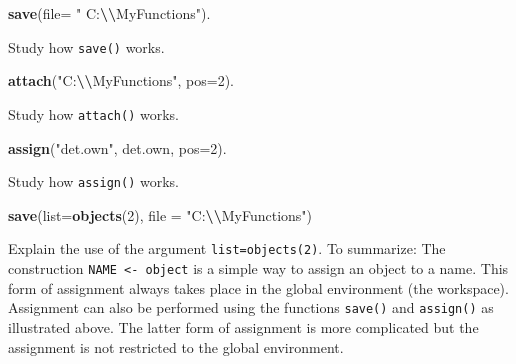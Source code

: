 \documentclass[
]{book}
\newenvironment{Shaded}{\begin{snugshade}}{\end{snugshade}}
\newcommand{\AttributeTok}[1]{\textcolor[rgb]{0.13,0.29,0.53}{#1}}
\newcommand{\DecValTok}[1]{\textcolor[rgb]{0.00,0.00,0.81}{#1}}
\newcommand{\FunctionTok}[1]{\textcolor[rgb]{0.13,0.29,0.53}{\textbf{#1}}}
\newcommand{\NormalTok}[1]{#1}
\newcommand{\SpecialCharTok}[1]{\textcolor[rgb]{0.81,0.36,0.00}{\textbf{#1}}}
\newcommand{\StringTok}[1]{\textcolor[rgb]{0.31,0.60,0.02}{#1}}
\begin{document}
\begin{Shaded}
\begin{Highlighting}[]
\FunctionTok{save}\NormalTok{(}\AttributeTok{file=} \StringTok{" C:}\SpecialCharTok{\textbackslash{}\textbackslash{}}\StringTok{MyFunctions"}\NormalTok{).  }
\end{Highlighting}
\end{Shaded}

Study how \texttt{save()} works.

\begin{Shaded}
\begin{Highlighting}[]
\FunctionTok{attach}\NormalTok{(}\StringTok{"C:}\SpecialCharTok{\textbackslash{}\textbackslash{}}\StringTok{MyFunctions"}\NormalTok{, }\AttributeTok{pos=}\DecValTok{2}\NormalTok{). }
\end{Highlighting}
\end{Shaded}

Study how \texttt{attach()} works.

\begin{Shaded}
\begin{Highlighting}[]
\FunctionTok{assign}\NormalTok{(}\StringTok{"det.own"}\NormalTok{, det.own, }\AttributeTok{pos=}\DecValTok{2}\NormalTok{). }
\end{Highlighting}
\end{Shaded}

Study how \texttt{assign()} works.

\begin{Shaded}
\begin{Highlighting}[]
\FunctionTok{save}\NormalTok{(}\AttributeTok{list=}\FunctionTok{objects}\NormalTok{(}\DecValTok{2}\NormalTok{), }\AttributeTok{file =} \StringTok{"C:}\SpecialCharTok{\textbackslash{}\textbackslash{}}\StringTok{MyFunctions"}\NormalTok{)}
\end{Highlighting}
\end{Shaded}

Explain the use of the argument \texttt{list=objects(2)}. To summarize: The construction \texttt{NAME\ \textless{}-\ object} is a simple way to assign an object to a name. This form of assignment always takes place in the global environment (the workspace). Assignment can also be performed using the functions \texttt{save()} and \texttt{assign()} as illustrated above. The latter form of assignment is more complicated but the assignment is not restricted to the global environment.
\end{document}
